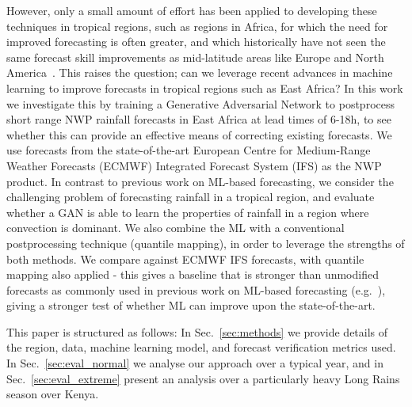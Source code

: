 \documentclass{article}
\begin{document}
However, only a small amount of effort has been applied to developing these techniques in tropical regions, such as regions in Africa, for which the need for improved forecasting is often greater, and which historically have not seen the same forecast skill improvements as mid-latitude areas like Europe and North America~\citep{youds_gcrf_2021}. This raises the question; can we leverage recent advances in machine learning to improve forecasts in tropical regions such as East Africa? In this work we investigate this by training a Generative Adversarial Network to postprocess short range NWP rainfall forecasts in East Africa at lead times of 6-18h, to see whether this can provide an effective means of correcting existing forecasts. We use forecasts from the state-of-the-art European Centre for Medium-Range Weather Forecasts (ECMWF) Integrated Forecast System (IFS) as the NWP product. In contrast to previous work on ML-based forecasting, we consider the challenging problem of forecasting rainfall in a tropical region, and evaluate whether a GAN is able to learn the properties of rainfall in a region where convection is dominant. We also combine the ML with a conventional postprocessing technique (quantile mapping), in order to leverage the strengths of both methods. We compare against ECMWF IFS forecasts, with quantile mapping also applied - this gives a baseline that is stronger than unmodified forecasts as commonly used in previous work on ML-based forecasting (e.g.~\citep{bi_pangu-weather_2022}), giving a stronger test of whether ML can improve upon the state-of-the-art. 

This paper is structured as follows: In Sec.~\ref{sec:methods} we provide details of the region, data, machine learning model, and forecast verification metrics used. In Sec.~\ref{sec:eval_normal} we analyse our approach over a typical year, and in Sec.~\ref{sec:eval_extreme} present an analysis over a particularly heavy Long Rains season over Kenya.




\end{document}
